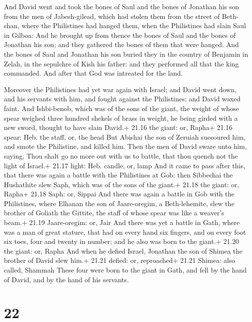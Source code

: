  And David went and took the bones of Saul and the bones
of Jonathan his son from the men of Jabesh-gilead, which had stolen them
from the street of Beth-shan, where the Philistines had hanged them,
when the Philistines had slain Saul in Gilboa:  And he
brought up from thence the bones of Saul and the bones of Jonathan his
son; and they gathered the bones of them that were hanged. 
And the bones of Saul and Jonathan his son buried they in the country of
Benjamin in Zelah, in the sepulchre of Kish his father: and they
performed all that the king commanded. And after that God was intreated
for the land.

 Moreover the Philistines had yet war again with Israel;
and David went down, and his servants with him, and fought against the
Philistines: and David waxed faint.  And Ishbi-benob, which
was of the sons of the giant, the weight of whose spear weighed three
hundred shekels of brass in weight, he being girded with a new sword,
thought to have slain David.+ 21.16 the giant: or, Rapha+ 21.16 spear:
Heb. the staff, or, the head  But Abishai the son of
Zeruiah succoured him, and smote the Philistine, and killed him. Then
the men of David sware unto him, saying, Thou shalt go no more out with
us to battle, that thou quench not the light of Israel.+ 21.17 light:
Heb. candle, or, lamp  And it came to pass after this, that
there was again a battle with the Philistines at Gob: then Sibbechai the
Hushathite slew Saph, which was of the sons of the giant.+ 21.18 the
giant: or, Rapha+ 21.18 Saph: or, Sippai  And there was
again a battle in Gob with the Philistines, where Elhanan the son of
Jaare-oregim, a Beth-lehemite, slew the brother of Goliath the Gittite,
the staff of whose spear was like a weaver's beam.+ 21.19 Jaare-oregim:
or, Jair  And there was yet a battle in Gath, where was a
man of great stature, that had on every hand six fingers, and on every
foot six toes, four and twenty in number; and he also was born to the
giant.+ 21.20 the giant: or, Rapha  And when he defied
Israel, Jonathan the son of Shimea the brother of David slew him.+ 21.21
defied: or, reproached+ 21.21 Shimea: also called, Shammah 
These four were born to the giant in Gath, and fell by the hand of
David, and by the hand of his servants.

\hypertarget{section-21}{%
\section{22}\label{section-21}}

